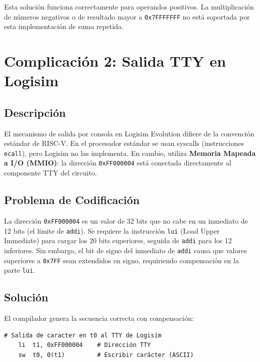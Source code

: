 \begin{notebox}
Esta solución funciona correctamente para operandos positivos. La multiplicación de números negativos o de resultado mayor a \texttt{0x7FFFFFFF} no está soportada por esta implementación de suma repetida.
\end{notebox}

\section{Complicación 2: Salida TTY en Logisim}

\subsection{Descripción}

El mecanismo de salida por consola en Logisim Evolution difiere de la convención estándar de RISC-V. En el procesador estándar se usan syscalls (instrucciones \texttt{ecall}), pero Logisim no las implementa. En cambio, utiliza \textbf{Memoria Mapeada a I/O (MMIO)}: la dirección \texttt{0xFF000004} está conectada directamente al componente TTY del circuito.

\subsection{Problema de Codificación}

La dirección \texttt{0xFF000004} es un valor de 32 bits que no cabe en un inmediato de 12 bits (el límite de \texttt{addi}). Se requiere la instrucción \texttt{lui} (Load Upper Immediate) para cargar los 20 bits superiores, seguida de \texttt{addi} para los 12 inferiores. Sin embargo, el bit de signo del inmediato de \texttt{addi} causa que valores superiores a \texttt{0x7FF} sean extendidos en signo, requiriendo compensación en la parte \texttt{lui}.

\subsection{Solución}

El compilador genera la secuencia correcta con compensación:

\begin{lstlisting}[style=asmstyle, caption={Acceso a TTY Logisim con compensación de signo}]
    # Salida de caracter en t0 al TTY de Logisim
    li  t1, 0xFF000004    # Dirección TTY
    sw  t0, 0(t1)         # Escribir carácter (ASCII)
\end{lstlisting}

